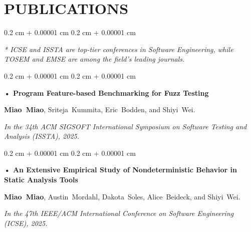 \documentclass[10pt, letterpaper]{article}
\newenvironment{onecolentry}{
    \begin{adjustwidth}{
        0.2 cm + 0.00001 cm
    }{
        0.2 cm + 0.00001 cm
    }
}{
    \end{adjustwidth}
} %
\begin{document}
        
    \section{PUBLICATIONS}

    \begin{onecolentry}
        \textit{* ICSE and ISSTA are top-tier conferences in Software Engineering, while TOSEM and EMSE are among the field's leading journals.}
    \end{onecolentry}

    \vspace{0.20 cm}

            \begin{onecolentry}
                \textbf{• Program Feature-based Benchmarking for Fuzz Testing}


                \mbox{\textbf{Miao Miao}}, \mbox{Sriteja Kummita}, \mbox{Eric Bodden}, and \mbox{Shiyi Wei}.
                
                
                \textit{In the 34th ACM SIGSOFT International Symposium on Software Testing and Analysis (ISSTA), 2025.}
            \end{onecolentry}


            \vspace{0.20 cm}
            
            \begin{onecolentry}
                \textbf{• An Extensive Empirical Study of Nondeterministic Behavior in Static Analysis Tools}


                \mbox{\textbf{Miao Miao}}, \mbox{Austin Mordahl}, \mbox{Dakota Soles}, \mbox{Alice Beideck}, and \mbox{Shiyi Wei}.
                
                
                \textit{In the 47th IEEE/ACM International Conference on Software Engineering (ICSE), 2025.}
            \end{onecolentry}

            \vspace{0.20 cm}
            
\end{document}

